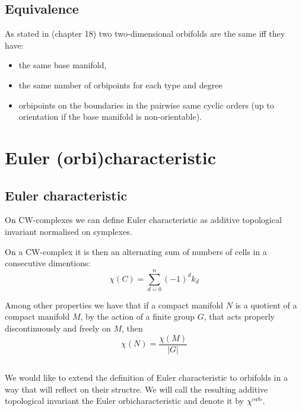 \subsection{Equivalence}\label{sameness}
As stated in \cite{Conway16} (chapter 18) two two-dimensional orbifolds are the same iff they have:
\begin{itemize}
\item the same base manifold, 
\item the same number of orbipoints for each type and degree 
\item orbipoints on the boundaries 
in the pairwise same cyclic orders (up to orientation if the base manifold is non-orientable).
\end{itemize}



\section{Euler (orbi)characteristic}\label{E_orb}
\label{\Eoc_as_a_sum}
\subsection{Euler characteristic}
On CW-complexes we can define Euler characteristic as additive topological invariant 
normalised on symplexes.

On a CW-complex it is then an alternating sum of numbers of cells in 
a consecutive dimentions: 
\begin{equation}
\chi(C) = \sum_{d = 0}^n (-1)^d k_d
\end{equation}

Among other properties we have that if a compact manifold $N$ is a quotient of a compact 
manifold $M$, 
by the action of a finite group $G$, that acts properly discontinuously and freely on $M$, then
\begin{equation}
\chi(N) = \frac{\chi(M)}{|G|}
\end{equation}   


\subsection{\Eoc}\label{Eoc}\label{extended_Euler_orbicharacteristic}
We would like to extend the definition of Euler characteristic to orbifolds in a way 
that will reflect on their structre. 
We will call the resulting additive topological invariant the Euler orbicharacteristic 
and denote it by $\chi^{\rm orb}$.


